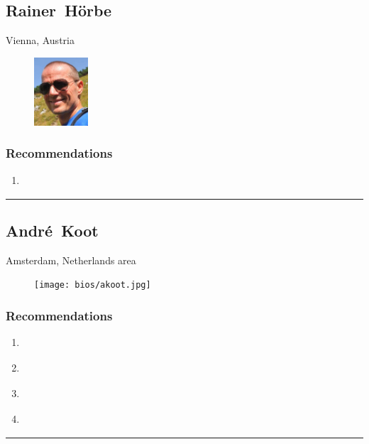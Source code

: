 \subsection{Rainer~Hörbe} \textsf{Vienna, Austria} \par \setlength{\columnsep}{0pt} \begin{figure} \centering \includegraphics[width=0.18\textwidth]{bios/r2h2.jpg} \end{figure}  \subsubsection{Recommendations}\begin{enumerate}
\item \cite{IAMPrimer2016}
\end{enumerate}\noindent\rule{\textwidth}{0.2pt}

\subsection{André~Koot} \textsf{Amsterdam, Netherlands area} \par \setlength{\columnsep}{0pt} \begin{figure} \centering \texttt{[image: bios/akoot.jpg]} \end{figure}  \subsubsection{Recommendations}\begin{enumerate}
\item \cite{Cameron2005}
\item \cite{Hardt2005}
\item \cite{Harper2006}
\item \cite{Williamson2017}
\end{enumerate}\noindent\rule{\textwidth}{0.2pt}

